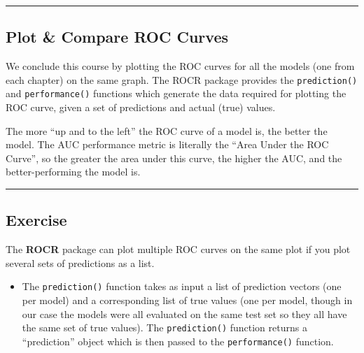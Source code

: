 \documentclass[
]{book}
\newenvironment{Shaded}{\begin{snugshade}}{\end{snugshade}}
\newcommand{\CommentTok}[1]{\textcolor[rgb]{0.56,0.35,0.01}{\textit{#1}}}
\newcommand{\KeywordTok}[1]{\textcolor[rgb]{0.13,0.29,0.53}{\textbf{#1}}}
\newcommand{\NormalTok}[1]{#1}
\newcommand{\StringTok}[1]{\textcolor[rgb]{0.31,0.60,0.02}{#1}}
\providecommand{\tightlist}{%
  \setlength{\itemsep}{0pt}\setlength{\parskip}{0pt}}
\begin{document}
\begin{Shaded}
\end{Shaded}

\begin{center}\rule{0.5\linewidth}{0.5pt}\end{center}

\hypertarget{plot-compare-roc-curves}{%
\subsection{Plot \& Compare ROC Curves}\label{plot-compare-roc-curves}}

We conclude this course by plotting the ROC curves for all the models (one from each chapter) on the same graph. The ROCR package provides the \texttt{prediction()} and \texttt{performance()} functions which generate the data required for plotting the ROC curve, given a set of predictions and actual (true) values.

The more ``up and to the left'' the ROC curve of a model is, the better the model. The AUC performance metric is literally the ``Area Under the ROC Curve'', so the greater the area under this curve, the higher the AUC, and the better-performing the model is.

\begin{center}\rule{0.5\linewidth}{0.5pt}\end{center}

\hypertarget{exercise-28}{%
\subsection*{Exercise}\label{exercise-28}}

The \textbf{ROCR} package can plot multiple ROC curves on the same plot if you plot several sets of predictions as a list.

\begin{itemize}
\tightlist
\item
  The \texttt{prediction()} function takes as input a list of prediction vectors (one per model) and a corresponding list of true values (one per model, though in our case the models were all evaluated on the same test set so they all have the same set of true values). The \texttt{prediction()} function returns a ``prediction'' object which is then passed to the \texttt{performance()} function.
\end{itemize}
\end{document}
